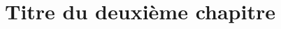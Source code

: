 \documentclass[../main/main.tex]{subfiles}
\begin{document}
\onlyinsubfile{%
    \setcounter{chapter}{1}
}


\chapter{Titre du deuxième chapitre}%
\label{chap:label-chapitre-2}

\clearpage{}

\clearpage{}
\end{document}
